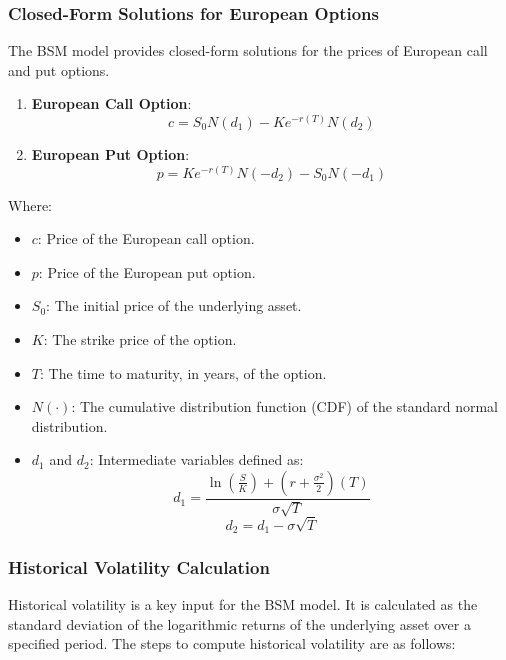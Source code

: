 \documentclass[11pt, oneside, a4paper, titlepage]{report}
\begin{document}
\subsubsection{Closed-Form Solutions for European Options}

The BSM model provides closed-form solutions for the prices of European call and put options.

\begin{enumerate}
    \item \textbf{European Call Option}:
    \[
    c = S_0 N(d_1) - K e^{-r(T)} N(d_2)
    \]
    \item \textbf{European Put Option}:
    \[
    p = K e^{-r(T)} N(-d_2) - S_0 N(-d_1)
    \]
\end{enumerate}

Where:
\begin{itemize}
    \item \( c \): Price of the European call option.
    \item \( p \): Price of the European put option.
    \item \( S_0 \): The initial price of the underlying asset.
    \item \( K \): The strike price of the option.
    \item \( T \): The time to maturity, in years, of the option.
    \item \( N(\cdot) \): The cumulative distribution function (CDF) of the standard normal distribution.
    \item \( d_1 \) and \( d_2 \): Intermediate variables defined as:
    \[
    d_1 = \frac{\ln\left(\frac{S}{K}\right) + \left(r + \frac{\sigma^2}{2}\right)(T)}{\sigma \sqrt{T}}
    \]
    \[
    d_2 = d_1 - \sigma \sqrt{T}
    \]
\end{itemize}

\subsubsection{Historical Volatility Calculation}

Historical volatility is a key input for the BSM model. It is calculated as the standard deviation of the logarithmic returns of the underlying asset over a specified period. The steps to compute historical volatility are as follows:
\end{document}
